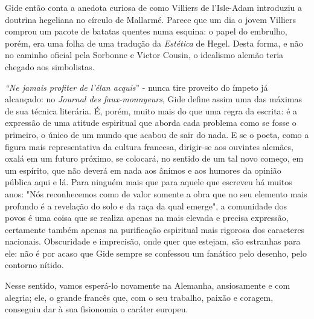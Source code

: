 Gide então conta a anedota curiosa de como Villiers de l'Isle-Adam
introduziu a doutrina hegeliana no círculo de Mallarmé. Parece que um
dia o jovem Villiers comprou um pacote de batatas quentes numa esquina:
o papel do embrulho, porém, era uma folha de uma tradução da
\emph{Estética} de Hegel. Desta forma, e não no caminho oficial pela
Sorbonne e Victor Cousin, o idealismo alemão teria chegado aos
simbolistas.

\emph{``Ne jamais profiter de l'élan acquis}'' - nunca tire proveito do
ímpeto já alcançado: no \emph{Journal des faux-monnyeurs}, Gide define
assim uma das máximas de sua técnica literária. É, porém, muito mais do
que uma regra da escrita: é a expressão de uma atitude espiritual que
aborda cada problema como se fosse o primeiro, o único de um mundo que
acabou de sair do nada. E se o poeta, como a figura mais representativa
da cultura francesa, dirigir-se aos ouvintes alemães, oxalá em um futuro
próximo, se colocará, no sentido de um tal novo começo, em um espírito,
que não deverá em nada aos ânimos e aos humores da opinião pública aqui
e lá. Para ninguém mais que para aquele que escreveu há muitos anos:
"Nós reconhecemos como de valor somente a obra que no seu elemento mais
profundo é a revelação do solo e da raça da qual emerge", a comunidade
dos povos é uma coisa que se realiza apenas na mais elevada e precisa
expressão, certamente também apenas na purificação espiritual mais
rigorosa dos caracteres nacionais. Obscuridade e imprecisão, onde quer
que estejam, são estranhas para ele: não é por acaso que Gide sempre se
confessou um fanático pelo desenho, pelo contorno nítido.

Nesse sentido, vamos esperá-lo novamente na Alemanha, ansiosamente e com
alegria; ele, o grande francês que, com o seu trabalho, paixão e
coragem, conseguiu dar à sua fisionomia o caráter europeu.
